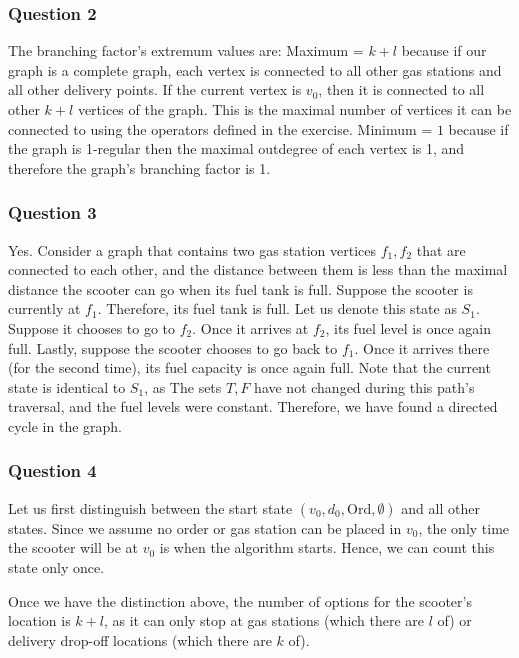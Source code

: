 \documentclass[11pt]{article}
\begin{document}
    \subsubsection{Question 2}\label{question-2}

The branching factor's extremum values are: Maximum = \(k+l\) because if
our graph is a complete graph, each vertex is connected to all other gas
stations and all other delivery points. If the current vertex is
\(v_0\), then it is connected to all other \(k+l\) vertices of the
graph. This is the maximal number of vertices it can be connected to
using the operators defined in the exercise. Minimum = \(1\) because if
the graph is 1-regular then the maximal outdegree of each vertex
is 1, and therefore the graph's branching factor is 1.

    \subsubsection{Question 3}\label{question-3}

Yes. Consider a graph that contains two gas station vertices \(f_1,f_2\)
that are connected to each other, and the distance between them is less
than the maximal distance the scooter can go when its fuel tank is full.
Suppose the scooter is currently at \(f_1\). Therefore, its fuel tank is
full. Let us denote this state as \(S_1\). Suppose it chooses to go to
\(f_2\). Once it arrives at \(f_2\), its fuel level is once again full.
Lastly, suppose the scooter chooses to go back to \(f_1\). Once it
arrives there (for the second time), its fuel capacity is once again
full. Note that the current state is identical to \(S_1\), as The sets
\(T,F\) have not changed during this path's traversal, and the fuel
levels were constant. Therefore, we have found a directed cycle in the
graph.

    \subsubsection{Question 4}\label{question-4}

Let us first distinguish between the start state
\(\left(v_0,d_0,\textrm{Ord},\emptyset \right)\) and all other states.
Since we assume no order or gas station can be placed in \(v_0\), the
only time the scooter will be at \(v_0\) is when the algorithm starts.
Hence, we can count this state only once.

Once we have the distinction above, the number of options for the
scooter's location is \(k+l\), as it can only stop at gas stations
(which there are \(l\) of) or delivery drop-off locations (which there
are \(k\) of).
\end{document}
